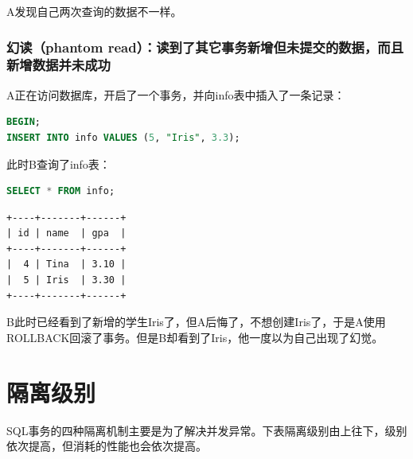 \documentclass[12pt, openany, oneside]{book}
\begin{document}
A发现自己两次查询的数据不一样。

\subsubsection{幻读（phantom read）：读到了其它事务新增但未提交的数据，而且新增数据并未成功}

A正在访问数据库，开启了一个事务，并向info表中插入了一条记录：

\vspace{-0.5cm}

\begin{lstlisting}[language=SQL]
BEGIN;
INSERT INTO info VALUES (5, "Iris", 3.3);
\end{lstlisting}

此时B查询了info表：

\vspace{-0.5cm}

\begin{lstlisting}[language=SQL]
SELECT * FROM info;
\end{lstlisting}

\begin{tcolorbox}
	\begin{verbatim}
+----+-------+------+
| id | name  | gpa  |
+----+-------+------+
|  4 | Tina  | 3.10 |
|  5 | Iris  | 3.30 |
+----+-------+------+
	\end{verbatim}
\end{tcolorbox}

B此时已经看到了新增的学生Iris了，但A后悔了，不想创建Iris了，于是A使用ROLLBACK回滚了事务。但是B却看到了Iris，他一度以为自己出现了幻觉。\\

\section{隔离级别}

SQL事务的四种隔离机制主要是为了解决并发异常。下表隔离级别由上往下，级别依次提高，但消耗的性能也会依次提高。

\begin{table}[H]
	\centering
	\caption{隔离级别}
\end{table}
\end{document}
